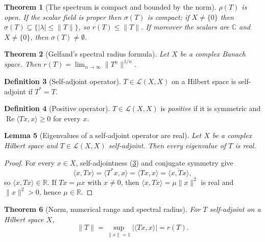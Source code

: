 \documentclass[a4paper]{report}
\theoremstyle{plain}
\newtheorem{theorem}{Theorem}[chapter]
\newtheorem{lemma}[theorem]{Lemma}
\theoremstyle{definition}
\newtheorem{definition}[theorem]{Definition}
\theoremstyle{remark}
\begin{document}
\begin{theorem}[The spectrum is compact and bounded by the norm]
  \label{thm_spectrum_compact}
  $\rho(T)$ is open.  If the scalar field is proper then
  $\sigma(T)$ is compact; if $X \ne \{0\}$ then
  $\sigma(T) \subseteq \{|\lambda| \le \|T\|\}$, so $r(T) \le \|T\|$.  If moreover the
  scalars are $\mathbb{C}$ and $X \ne \{0\}$, then $\sigma(T) \ne \emptyset$.
\end{theorem}


\begin{theorem}[Gelfand's spectral radius formula]
  \label{thm_gelfand}
  Let $X$ be a \emph{complex} Banach space.  Then
  $r(T) = \lim_{n\to\infty}\|T^n\|^{1/n}$.
\end{theorem}


\begin{definition}[Self-adjoint operator]
  \label{def_selfadjoint}
  $T \in \mathcal{L}(X,X)$ on a Hilbert space is self-adjoint if $T^* = T$.
\end{definition}


\begin{definition}[Positive operator]
  \label{def_positive}
  $T \in \mathcal{L}(X,X)$ is \emph{positive} if it is symmetric and
  $\operatorname{Re}\langle Tx,x\rangle \ge 0$ for every $x$.
\end{definition}


\begin{lemma}[Eigenvalues of a self-adjoint operator are real]
  \label{lem_eigenvalue_real}
  Let $X$ be a complex Hilbert space and $T \in \mathcal{L}(X,X)$ self-adjoint.  Then
  every eigenvalue of $T$ is real.
\end{lemma}
\begin{proof}
  For every $x \in X$, self-adjointness (\cref{def_selfadjoint}) and conjugate symmetry
  give
  \[
    \langle x,Tx\rangle = \langle T^*x,x\rangle = \langle Tx,x\rangle
      = \overline{\langle x,Tx\rangle},
  \]
  so $\langle x,Tx\rangle \in \mathbb{R}$.  If $Tx = \mu x$ with $x \ne 0$, then
  $\langle x,Tx\rangle = \mu\|x\|^2$ is real and $\|x\|^2 > 0$, hence $\mu \in \mathbb{R}$.
\end{proof}




\begin{theorem}[Norm, numerical range and spectral radius]
  \label{thm_spectral_radius}
  For $T$ self-adjoint on a Hilbert space $X$,
  \[
    \|T\| = \sup_{\|x\|=1}\bigl|\langle Tx,x\rangle\bigr| = r(T) .
  \]
\end{theorem}
\end{document}
